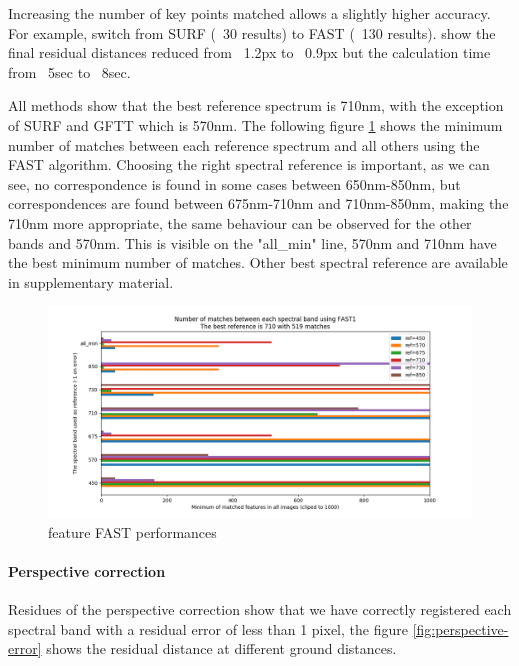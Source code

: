 \documentclass[]{elsarticle}
\begin{document}
	Increasing the number of key points matched allows a slightly higher accuracy. For example, switch from SURF (~30 results) to FAST (~130 results). show the final residual distances reduced from ~1.2px to ~0.9px but the calculation time from ~5sec to ~8sec.

	All methods show that the best reference spectrum is 710nm, with the exception of SURF and GFTT which is 570nm.
	The following figure \ref{fig:features-FAST-performances} shows the minimum number of matches between each reference spectrum and all others using the FAST algorithm.
	Choosing the right spectral reference is important, as we can see, no correspondence is found in some cases between 650nm-850nm,
	but correspondences are found between 675nm-710nm and 710nm-850nm, making the 710nm more appropriate,
	the same behaviour can be observed for the other bands and 570nm.
	This is visible on the "all\_min" line, 570nm and 710nm have the best minimum number of matches.
	Other best spectral reference are available in supplementary material.
	
	\begin{figure}[!htb]
		\centering
		\includegraphics[width=\linewidth]{../figures/comparaison-keypoint-matching-reference-FAST1.png}
		\caption{feature FAST performances}
		\label{fig:features-FAST-performances}
	\end{figure}

	\newpage
	
	\paragraph{Perspective correction}
	Residues of the perspective correction show that we have correctly registered each spectral band with a residual error of less than 1 pixel,
	the figure \ref{fig:perspective-error} shows the residual distance at different ground distances.
	
\end{document}
